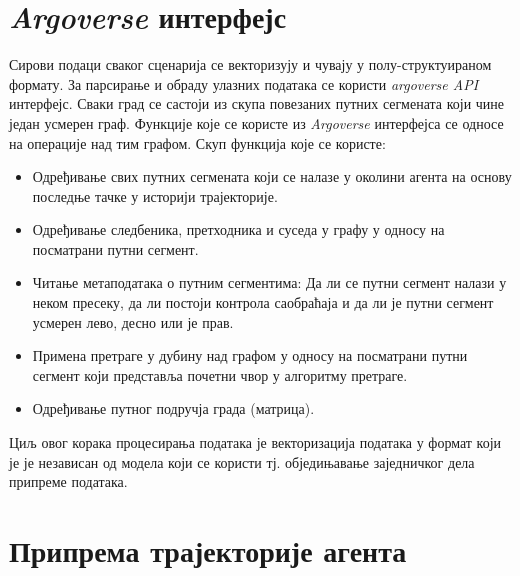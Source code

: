 \documentclass[11pt,oneside]{memoir}
\begin{document}
\section{\textit{Argoverse} интерфејс}

Сирови подаци сваког сценарија се векторизују и чувају у полу-структуираном формату. 
За парсирање и обраду улазних података се користи \textit{argoverse API} интерфејс. Сваки град се састоји из скупа
повезаних путних сегмената који чине један усмерен граф. Функције које се користе из \textit{Argoverse} интерфејса се 
односе на операције над тим графом. Скуп функција које се користе:
\begin{itemize}
  \item Одређивање свих путних сегмената који се налазе у околини агента на основу последње тачке у историји трајекторије.
  \item Одређивање следбеника, претходника и суседа у графу у односу на посматрани путни сегмент.
  \item Читање метаподатака о путним сегментима: Да ли се путни сегмент налази у неком пресеку, да ли постоји контрола саобраћаја и
        да ли је путни сегмент усмерен лево, десно или је прав.
  \item Примена претраге у дубину над графом у односу на посматрани путни сегмент који представља почетни чвор у алгоритму претраге.
  \item Одређивање путног подручја града (матрица).
\end{itemize}

Циљ овог корака процесирања података је векторизација података у формат који је је независан од модела који се користи тј.
обједињавање заједничког дела припреме података.

\section{Припрема трајекторије агента}
\end{document}
